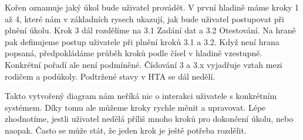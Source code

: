 Kořen oznamuje jaký úkol bude uživatel provádět. V první hladině máme kroky 1 až 4, které nám v základních rysech ukazují, jak bude uživatel postupovat při plnění úkolu. Krok 3 dál rozdělíme na 3.1 Zadání dat a 3.2 Otestování. Na hraně pak definujeme postup uživatele při plnění kroků 3.1 a 3.2. Když není hrana popsaná, předpokládáme průběh kroků podle čísel v hladině vzestupně. Konkrétní pořadí ale není podmíněné. Číslování 3 a 3.x vyjadřuje vztah mezi rodičem a podúkoly.  Podtržené stavy v HTA se dál nedělí. 

Takto vytvořený diagram nám neříká nic o interakci uživatele s konkrétním systémem. Díky tomu ale můžeme kroky rychle měnit a upravovat. Lépe zhodnotíme, jestli uživatel nedělá příliš mnoho kroků pro dokončení úkolu, nebo naopak. Často se může stát, že jeden krok je ještě potřeba rozdělit.

